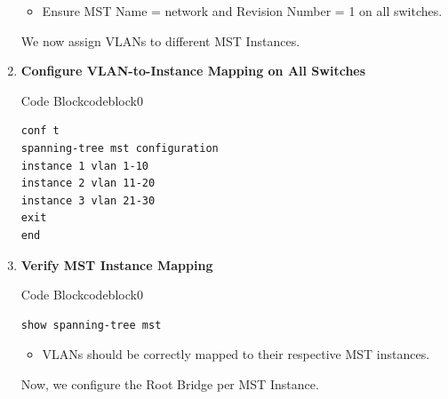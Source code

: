 \documentclass[a4paper]{book}
\begin{document}
\begin{enumerate}
	      \begin{itemize}
		      \item Ensure MST Name = network and Revision Number = 1 on all switches.
	      \end{itemize}
	      \vspace{1cm}
	      We now assign VLANs to different MST Instances.

	\item \textbf{Configure VLAN-to-Instance Mapping on All Switches}



	      \begin{ocg}{Code Block}{codeblock}{0}
		      \vspace{0.5cm}
		      \begin{lstlisting}
conf t
spanning-tree mst configuration
instance 1 vlan 1-10
instance 2 vlan 11-20
instance 3 vlan 21-30
exit
end
\end{lstlisting}
	      \end{ocg}





	\item \textbf{Verify MST Instance Mapping}




	      \begin{ocg}{Code Block}{codeblock}{0}
		      \vspace{0.5cm}
		      \begin{lstlisting}
show spanning-tree mst
\end{lstlisting}
	      \end{ocg}


	      \begin{itemize}
		      \item VLANs should be correctly mapped to their respective MST instances.
	      \end{itemize}

          \vspace{1cm}

          Now, we configure the Root Bridge per MST Instance.


\end{enumerate}
\end{document}
